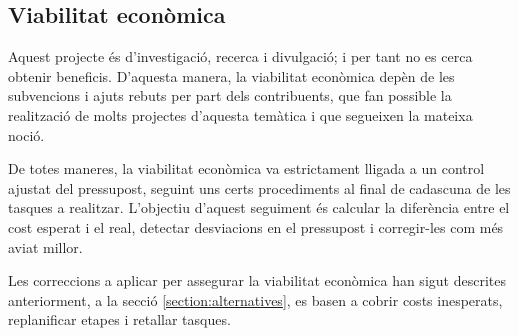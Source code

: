 \documentclass[a4paper]{article} %
\begin{document}
	\subsection{Viabilitat econòmica} \label{section:viabilitat}
	Aquest projecte és d'investigació, recerca i divulgació; i per tant no es cerca obtenir beneficis. D'aquesta manera, la viabilitat econòmica depèn de les subvencions i ajuts rebuts per part dels contribuents, que fan possible la realització de molts projectes d'aquesta temàtica i que segueixen la mateixa noció. \par
	De totes maneres, la viabilitat econòmica va estrictament lligada a un control ajustat del pressupost, seguint uns certs procediments al final de cadascuna de les tasques a realitzar. L'objectiu d'aquest seguiment és calcular la diferència entre el cost esperat i el real, detectar desviacions en el pressupost i corregir-les com més aviat millor. \par
	Les correccions a aplicar per assegurar la viabilitat econòmica han sigut descrites anteriorment, a la secció \ref{section:alternatives}, es basen a cobrir costs inesperats, replanificar etapes i retallar tasques.
	
\end{document}
